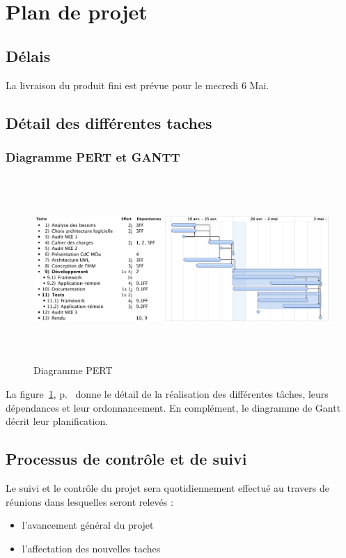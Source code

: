 
\section{Plan de projet}
\subsection{Délais}
La livraison du produit fini est prévue pour le mecredi 6 Mai.

\subsection{Détail des différentes taches}
\subsubsection{Diagramme PERT et GANTT}
\begin{figure}[thbp]
	\centering
		\includegraphics[height=7cm,angle=90]{../diagrammes/planification.pdf}
	\caption{Diagramme PERT}
	\label{fig:pert}
\end{figure}
La figure~\ref{fig:pert}, p.~\pageref{fig:pert} donne le détail de la réalisation des différentes tâches, leurs dépendances et leur ordonnancement. En complément, le diagramme de Gantt décrit leur planification.

\subsection{Processus de contrôle et de suivi}

Le suivi et le contrôle du projet sera quotidiennement effectué au travers de réunions dans lesquelles seront relevés : 
\begin{itemize}
 \item l'avancement général du projet
 \item l'affectation des nouvelles taches
\end{itemize}

